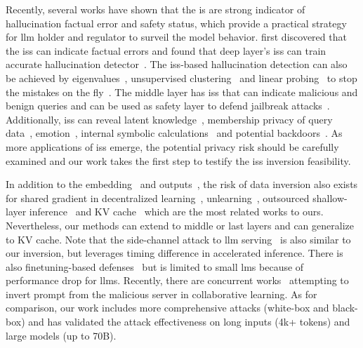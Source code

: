 \documentclass[letterpaper,twocolumn,10pt]{article}
\newcommand{\bheading}[1]{{\vspace{4pt}\noindent{\textbf{#1}}}}
\theoremstyle{definition}
\begin{document}
\bheading{Application of Internal States.}
Recently, several works have shown that the \ac{is} are strong indicator of hallucination factual error and safety status, which provide a practical strategy for \ac{llm} holder and regulator to surveil the model behavior.
\citeauthor{azaria-mitchell-2023-internal} first discovered that the \acp{is} can indicate factual errors and found that deep layer's \acp{is} can train accurate hallucination detector~\cite{azaria-mitchell-2023-internal}.
The \acp{is}-based hallucination detection can also be achieved by eigenvalues~\cite{chen2024inside}, unsupervised clustering~\cite{su-etal-2024-unsupervised} and linear probing~\cite{DBLP:journals/corr/abs-2406-15927} to stop the mistakes on the fly~\cite{ye2024physics}.
The middle layer has \acp{is} that can indicate malicious and benign queries and can be used as safety layer to defend jailbreak attacks~\cite{li2024safety}.
Additionally, \acp{is} can reveal latent knowledge~\cite{burns2023discovering}, membership privacy of query data~\cite{ji2024llm}, emotion~\cite{zhou-etal-2024-alignment,zou2023representation}, internal symbolic calculations~\cite{chen2024states} and potential backdoors~\cite{lamparth2024analyzing,dong2024trojaningplugins}.
As more applications of \acp{is} emerge, the potential privacy risk should be carefully examined and our work takes the first step to testify the \acp{is} inversion feasibility. 



\bheading{Inversion Attacks.}
In addition to the embedding~\cite{morris-etal-2023-text} and outputs~\cite{morris2024language,zhang2024extracting}, the risk of data inversion also exists for shared gradient in decentralized learning~\cite{DBLP:conf/nips/LiYLWHYX23,chen2024unveiling_ccs24}, unlearning~\cite{sp24unlearninversion}, outsourced shallow-layer inference~\cite{zheng2023input} and KV cache~\cite{yang2024lookefficientsecureondevice} which are the most related works to ours.
Nevertheless, our methods can extend to middle or last layers and can generalize to KV cache.
Note that the side-channel attack to \ac{llm} serving~\cite{wu2025promptleakkvcache} is also similar to our inversion, but leverages timing difference in accelerated inference.
There is also finetuning-based defenses~\cite{dpforward_ccs23} but is limited to small \acp{lm} because of performance drop for \acp{llm}.
Recently, there are concurrent works~\cite{pia_coll_sp25,luo2025prompt} attempting to invert prompt from the malicious server in collaborative learning.
As for comparison, our work includes more comprehensive attacks (white-box and black-box) and has validated the attack effectiveness on long inputs (4k+ tokens) and large models (up to 70B).
\end{document}

